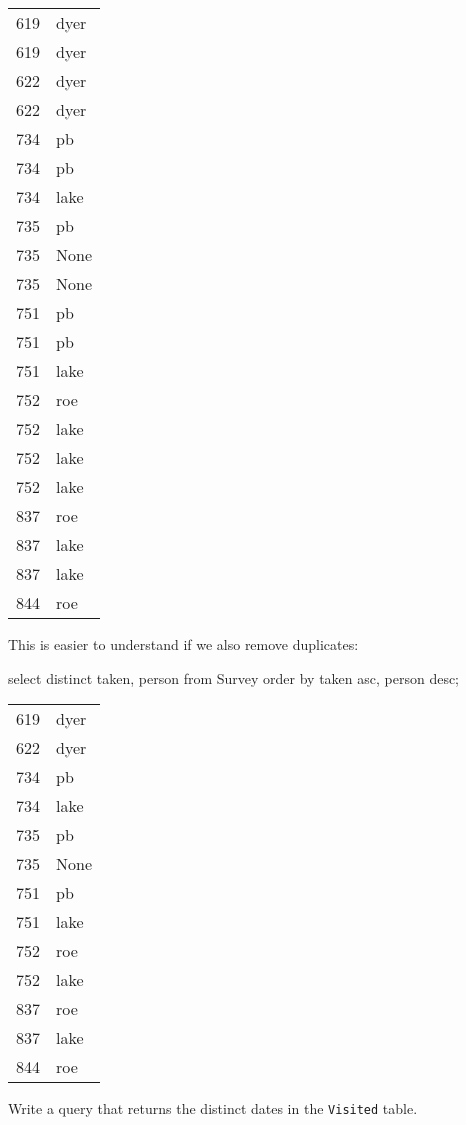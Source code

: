 \documentclass{book}
\begin{document}
\begin{tabular}{ll}
619 & dyer \\
619 & dyer \\
622 & dyer \\
622 & dyer \\
734 & pb \\
734 & pb \\
734 & lake \\
735 & pb \\
735 & None \\
735 & None \\
751 & pb \\
751 & pb \\
751 & lake \\
752 & roe \\
752 & lake \\
752 & lake \\
752 & lake \\
837 & roe \\
837 & lake \\
837 & lake \\
844 & roe \\
\end{tabular}

This is easier to understand if we also remove duplicates:

\begin{VerbIn}
select distinct taken, person from Survey order by taken asc, person desc;
\end{VerbIn}

\begin{tabular}{ll}
619 & dyer \\
622 & dyer \\
734 & pb \\
734 & lake \\
735 & pb \\
735 & None \\
751 & pb \\
751 & lake \\
752 & roe \\
752 & lake \\
837 & roe \\
837 & lake \\
844 & roe \\
\end{tabular}

\begin{challenge}
  Write a query that returns the distinct dates in the \texttt{Visited}
  table.
\end{challenge}
\end{document}
